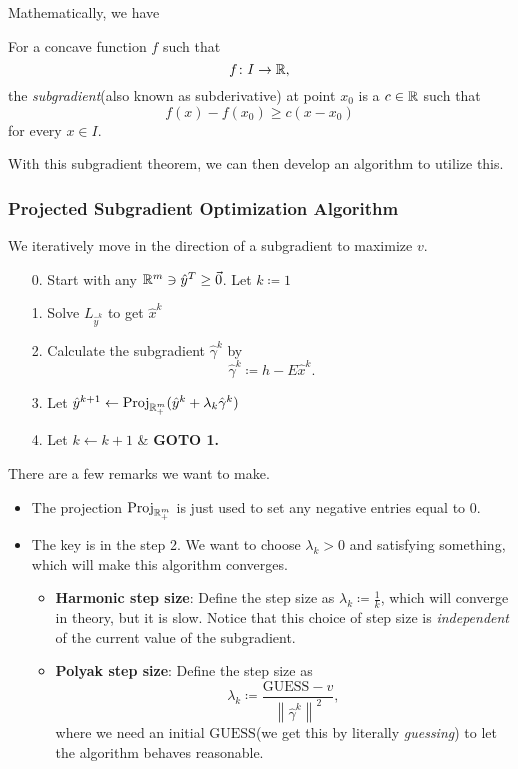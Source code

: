 Mathematically, we have
\begin{definition}
	\label{def:subgradient}
	For a concave function \(f\) such that
	\[
		f\colon I\to \mathbb{\MakeUppercase{R}},
	\]
	the \emph{subgradient}(also known as subderivative) at point \(x_0\) is a \(c\in \mathbb{\MakeUppercase{R}}\) such that
	\[
		f(x) - f(x_{0})\geq c(x - x_0)
	\]
	for every \(x\in I\).

\end{definition}

With this subgradient theorem, we can then develop an algorithm to utilize this.

\subsubsection{Projected Subgradient Optimization Algorithm}
\begin{intuition}
	We iteratively move in the direction of a subgradient to maximize \(v\).
\end{intuition}
\begin{enumerate}
	\item[0.] Start with any \(\mathbb{\MakeUppercase{R}}^m\ni \hat{y}^{T}\geq \vec{0}\). Let \(k\coloneqq 1\)
	\item[1.] Solve \(L_{\hat{y}^k}\) to get \(\hat{x}^k\)
	\item[2.] Calculate the subgradient \(\hat{\gamma}^k\) by
		\[
			\hat{\gamma}^k\coloneqq h - E \hat{x}^k.
		\]
	\item[3.] Let \(\hat{y}^{k+1}\leftarrow \mathrm{Proj}_{\mathbb{\MakeUppercase{R}}^m_+}(\hat{y}^k + \lambda_{k}\hat{\gamma}^k) \)
	\item[4.] Let \(k\leftarrow k+1\) \& \textbf{GOTO 1.}
\end{enumerate}
\begin{remark}
	There are a few remarks we want to make.
	\begin{itemize}
		\item The projection \(\mathrm{Proj}_{\mathbb{\MakeUppercase{R}}^m_+}\) is just used to set any negative entries equal to \(0\).
		\item The key is in the step 2. We want to choose \(\lambda_{k}>0\) and satisfying something, which will make this algorithm converges.
		      \begin{itemize}
			      \item \textbf{Harmonic step size}: Define the step size as \(\lambda_{k}\coloneqq \frac{1}{k}\), which will converge in theory, but it is slow. Notice that this choice of step size is \emph{independent} of the current value of the subgradient.
			      \item \textbf{Polyak step size}: Define the step size as
			            \[
				            \lambda_{k}\coloneqq \frac{\mathrm{GUESS} - v}{\left\lVert \hat{\gamma}^k\right\rVert^2 },
			            \]
			            where we need an initial \(\mathrm{GUESS}\)(we get this by literally \emph{guessing}) to let the algorithm behaves reasonable.
		      \end{itemize}
	\end{itemize}
\end{remark}